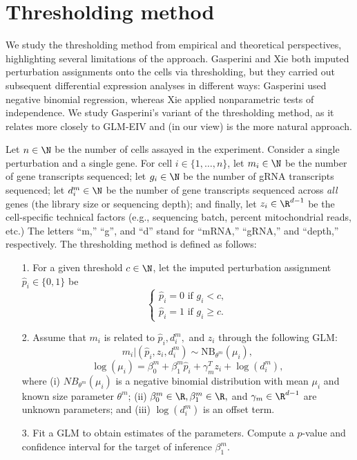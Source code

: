 \documentclass[12pt]{article}
\begin{document}
\section{Thresholding method}
We study the thresholding method from empirical and theoretical perspectives, highlighting several limitations of the approach. Gasperini and Xie both imputed perturbation assignments onto the cells via thresholding, but they carried out subsequent differential expression analyses in different ways: Gasperini used negative binomial regression, whereas Xie applied nonparametric tests of independence. We study Gasperini's variant of the thresholding method, as it relates more closely to GLM-EIV and (in our view) is the more natural approach.

Let $n \in \N$ be the number of cells assayed in the experiment. Consider a single perturbation and a single gene. For cell $i \in \{1, \dots, n\}$, let $m_i \in \N$ be the number of gene transcripts sequenced; let $g_i \in \N$ be the number of gRNA transcripts sequenced; let $d^m_i \in \N$ be the number of gene transcripts sequenced across \textit{all} genes (the library size or sequencing depth); and finally, let $z_i \in \R^{d-1}$ be the cell-specific technical factors (e.g., sequencing batch, percent mitochondrial reads, etc.) The letters ``m,'' ``g'', and ``d'' stand for ``mRNA,'' ``gRNA,'' and ``depth,'' respectively. The thresholding method is defined as follows:
\begin{itemize}
\item[1.] For a given threshold $c \in \N$, let the imputed perturbation assignment $\hat{p}_i \in \{0, 1\}$ be $$\begin{cases} \hat{p}_i = 0 \textrm{ if } g_i < c, \\ \hat{p}_i = 1 \textrm{ if } g_i \geq c. \end{cases}$$
\item[2.] Assume that $m_i$ is related to $\hat{p}_i, d^m_i,$ and $z_i$ through the following GLM:
$$m_i | (\hat{p}_i, z_i, d^m_i) \sim \textrm{NB}_{\theta^m}(\mu_i),$$
\begin{equation}\label{thresh_glm}
\log(\mu_i) = \beta^m_0 + \beta^m_1 \hat{p}_i + \gamma^T_m z_i + \log\left(d_i^m\right),
\end{equation}
where (i) $NB_{\theta^m}(\mu_i)$ is a negative binomial distribution with mean $\mu_i$ and known size parameter $\theta^m$; (ii) $\beta^m_0 \in \R, \beta^m_1 \in \R,$ and $\gamma_m \in  \R^{d-1}$ are unknown parameters; and (iii) $\log(d_i^m)$ is an offset term.

\item[3.]  Fit a GLM to obtain estimates of the parameters. Compute a $p$-value and confidence interval for the target of inference $\beta^m_1$.
\end{itemize}
\end{document}

